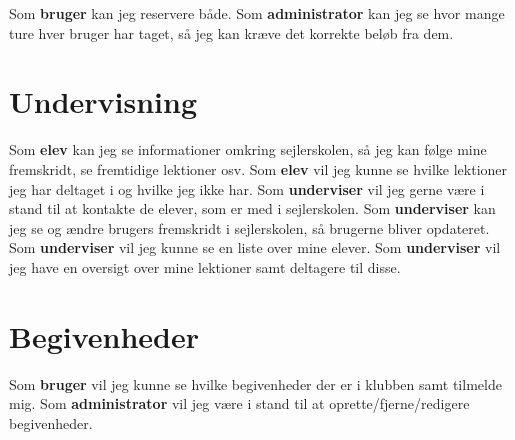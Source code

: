Som \textbf{bruger} kan jeg reservere både.
\newline
Som \textbf{administrator} kan jeg se hvor mange ture hver bruger har taget, så jeg kan kræve det korrekte beløb fra dem.

\section{Undervisning}
Som \textbf{elev} kan jeg se informationer omkring sejlerskolen, så jeg kan følge mine fremskridt, se fremtidige lektioner osv. 
\newline
Som \textbf{elev} vil jeg kunne se hvilke lektioner jeg har deltaget i og hvilke jeg ikke har.
\newline
Som \textbf{underviser} vil jeg gerne være i stand til at kontakte de elever, som er med i sejlerskolen.
\newline
Som \textbf{underviser} kan jeg se og ændre brugers fremskridt i sejlerskolen, så brugerne bliver opdateret.
\newline
Som \textbf{underviser} vil jeg kunne se en liste over mine elever.
\newline
Som \textbf{underviser} vil jeg have en oversigt over mine lektioner samt deltagere til disse.

\section{Begivenheder}
Som \textbf{bruger} vil jeg kunne se hvilke begivenheder der er i klubben samt tilmelde mig.
\newline
Som \textbf{administrator} vil jeg være i stand til at oprette/fjerne/redigere begivenheder.
